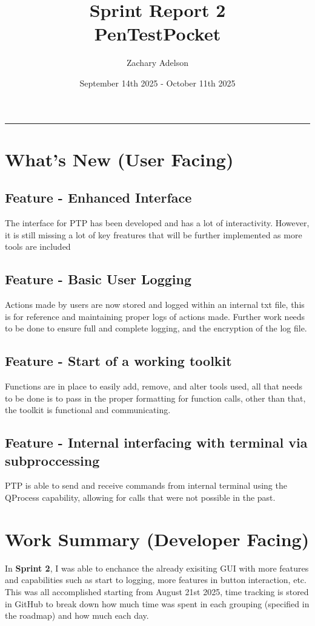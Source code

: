 \documentclass{article}
\title{Sprint Report 2\\\small{PenTestPocket}}
\author{Zachary Adelson}
\date{September 14th 2025 - October 11th 2025}
\begin{document}
\maketitle
\rule{10cm}{0.25pt}
\centering

\section{What's New (User Facing)}
\subsection{Feature - Enhanced Interface} The interface for PTP has been developed and has a lot of interactivity. However, it is still missing a lot of key freatures that will be further implemented as more tools are included

\subsection{Feature - Basic User Logging} Actions made by users are now stored and logged within an internal txt file, this is for reference and maintaining proper logs of actions made. Further work needs to be done to ensure full and complete logging, and the encryption of the log file.

\subsection{Feature - Start of a working toolkit} Functions are in place to easily add, remove, and alter tools used, all that needs to be done is to pass in the proper formatting for function calls, other than that, the toolkit is functional and communicating.

\subsection{Feature - Internal interfacing with terminal via subproccessing} PTP is able to send and receive commands from internal terminal using the QProcess capability, allowing for calls that were not possible in the past.
\newpage
\section{Work Summary (Developer Facing)}
\large{
In \textbf{Sprint 2}, I was able to enchance the already exisiting GUI with more features and capabilities such as start to logging, more features in button interaction, etc.\\ This was all accomplished starting from August 21st 2025, time tracking is stored in GitHub to break down how much time was spent in each grouping (specified in the roadmap) and how much each day.
}
\newpage
\end{document}
